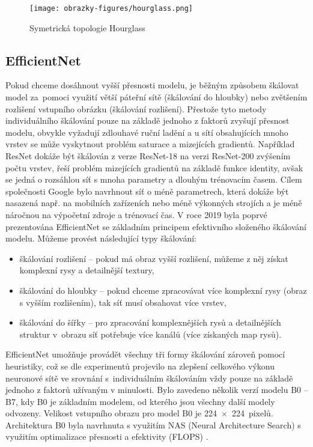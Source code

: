 \begin{figure}[!htbp]
    \centering
    \texttt{[image: obrazky-figures/hourglass.png]}
    \caption{Symetrická topologie Hourglass \cite{Hourglass}}
\end{figure}
\subsection*{EfficientNet}
Pokud chceme dosáhnout vyšší přesnosti modelu, je běžným způsobem škálovat model za~pomoci využití větší páteřní sítě (škálování do hloubky) nebo zvětšením rozlišení vstupního obrázku (škálování rozlišení). Přestože tyto metody individuálního škálování pouze na základě jednoho z faktorů zvyšují přesnost modelu, obvykle vyžadují zdlouhavé ruční ladění a u sítí obsahujících mnoho vrstev se může vyskytnout problém saturace a mizejících gradientů. Například ResNet dokáže být škálován z verze ResNet-18 na verzi ResNet-200 zvýšením počtu vrstev, řeší problém mizejících gradientů na základě funkce identity, avšak se jedná o rozsáhlou síť s mnoha parametry a dlouhým trénovacím časem. Cílem společnosti Google bylo navrhnout síť o méně parametrech, která dokáže být nasazená např. na mobilních zařízeních nebo méně výkonných strojích a  je méně náročnou na výpočetní zdroje a trénovací čas. V roce 2019 byla poprvé prezentována EfficientNet se základním principem efektivního složeného škálování modelu. Můžeme provést následující typy škálování:
\begin{itemize}
    \item škálování rozlišení -- pokud má obraz vyšší rozlišení, můžeme z něj získat komplexní rysy a detailnější textury,
    \item škálování do hloubky -- pokud chceme zpracovávat více komplexní rysy (obraz s vyšším rozlišením), tak síť musí obsahovat více vrstev,
    \item škálování do šířky -- pro zpracování komplexnějších rysů a detailnějších struktur v~obrazu síť potřebuje více kanálů (více získaných map rysů).
\end{itemize}

EfficientNet umožňuje provádět všechny tři formy škálování zároveň pomocí heuristiky, což se dle experimentů projevilo na zlepšení celkového výkonu neuronové sítě ve srovnání s~individuálním škálováním vždy pouze na základě jednoho z faktorů užívaným v minulosti.  Bylo zavedeno několik verzí modelu B0 -- B7, kdy B0 je základním modelem, od kterého jsou všechny další modely odvozeny. Velikost vstupního obrazu pro model B0 je 224~$\times$~224~pixelů. Architektura B0 byla navrhnuta s využitím NAS (Neural Architecture Search) s využitím optimalizace přesnosti a efektivity (FLOPS) \cite{EfficientNet, EfficientNetBlog}.

